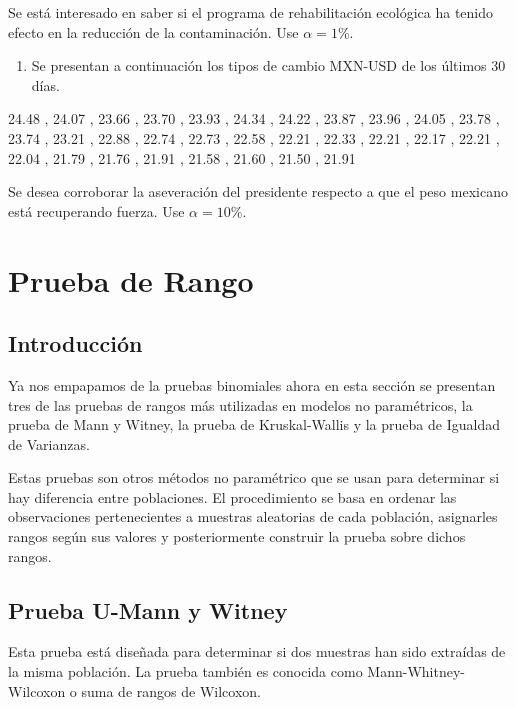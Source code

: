 \documentclass[
  a4paper,
  oneside,
  openany]{book}
\providecommand{\tightlist}{%
  \setlength{\itemsep}{0pt}\setlength{\parskip}{0pt}}
\begin{document}
Se está interesado en saber si el programa de rehabilitación ecológica ha tenido efecto en la reducción de la contaminación. Use \(\alpha =1\%\).

\begin{enumerate}
\def\labelenumi{\arabic{enumi}.}
\setcounter{enumi}{1}
\tightlist
\item
  Se presentan a continuación los tipos de cambio MXN-USD de los últimos 30 días.
\end{enumerate}

24.48 ,
24.07 ,
23.66 ,
23.70 ,
23.93 ,
24.34 ,
24.22 ,
23.87 ,
23.96 ,
24.05 ,
23.78 ,
23.74 ,
23.21 ,
22.88 ,
22.74 ,
22.73 ,
22.58 ,
22.21 ,
22.33 ,
22.21 ,
22.17 ,
22.21 ,
22.04 ,
21.79 ,
21.76 ,
21.91 ,
21.58 ,
21.60 ,
21.50 ,
21.91

Se desea corroborar la aseveración del presidente respecto a que el peso mexicano está recuperando fuerza. Use \(\alpha =10\%\).

\hypertarget{part-prueba-de-rango}{%
\part{Prueba de Rango}\label{part-prueba-de-rango}}

\hypertarget{introducciuxf3n-2}{%
\chapter*{Introducción}\label{introducciuxf3n-2}}


Ya nos empapamos de la pruebas binomiales ahora en esta sección se presentan tres de las pruebas de rangos más utilizadas en modelos no paramétricos, la prueba de Mann y Witney, la prueba de Kruskal-Wallis y la prueba de Igualdad de Varianzas.

Estas pruebas son otros métodos no paramétrico que se usan para determinar si hay diferencia entre poblaciones. El procedimiento se basa en ordenar las observaciones pertenecientes a muestras aleatorias de cada población, asignarles rangos según sus valores y posteriormente construir la prueba sobre dichos rangos.

\hypertarget{prueba-u-mann-y-witney}{%
\chapter{Prueba U-Mann y Witney}\label{prueba-u-mann-y-witney}}

Esta prueba está diseñada para determinar si dos muestras han sido extraídas de la misma población. La prueba también es conocida como Mann-Whitney-Wilcoxon o suma de rangos de Wilcoxon.
\end{document}
